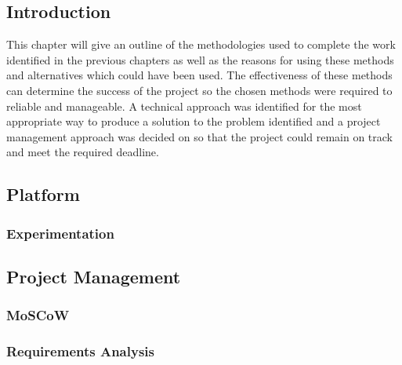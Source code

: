 \subsection{Introduction}
	This chapter will give an outline of the methodologies used to complete the work identified in the previous chapters as well as the reasons for using these methods and alternatives which could have been used. The effectiveness of these methods can determine the success of the project so the chosen methods were required to reliable and manageable. A technical approach was identified for the most appropriate way to produce a solution to the problem identified and a project management approach was decided on so that the project could remain on track and meet the required deadline.
\subsection{Platform}
	\subsubsection{Experimentation}
\subsection{Project Management}
	\subsubsection{MoSCoW}
	\subsubsection{Requirements Analysis}
